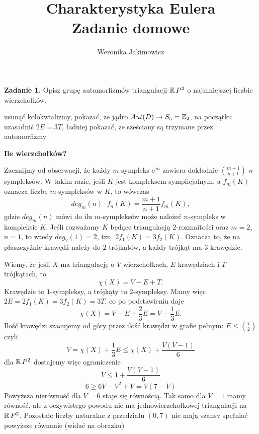 \documentclass{article}
\title{Charakterystyka Eulera\\{\normalsize Zadanie domowe}}
\author{Weronika Jakimowicz}
\date{}
\begin{document}
\maketitle

\textbf{\large\color{orange}Zadanie 1.} Opisz grupę automorfizmów triangulacji $\operatorname{\mathbb{R}} P^2$ o najmniejszej liczbie wierzchołków.

{\large\color{red}usunąć kolokwializmy, pokazać, że jądro $Aut(D)\to S_5=\operatorname{\mathbb{Z}}_2$, na początku uzasadnić $2E=3T$, ładniej pokazać, że sześciany są trzymane przez automorfizmy}

\textbf{Ile wierzchołków?}

Zacznijmy od obserwacji, że każdy $m$-sympleks $\sigma^m$ zawiera dokładnie $\binom{m+1}{n+1}$ $n$-sympleksów. W takim razie, jeśli $K$ jest kompleksem symplicjalnym, a $f_m(K)$ oznacza liczbę $m$-sympleksów w $K$, to wówczas
$$deg_m(n)\cdot f_n(K)=\frac{m+1}{n+1}f_m(K),$$
gdzie $deg_m(n)$ mówi do ilu $m$-sympleksów może należeć $n$-sympleks w kompleksie $K$. Jeśli rozważamy $K$ będące triangulacją $2$-rozmaitości oraz $m=2$, $n=1$, to wtedy $deg_2(1)=2$, tzn. $2 f_1(K)=3f_2(K)$. Oznacza to, że na płaszczyźnie krawędź należy do $2$ trójkątów, a każdy trójkąt ma $3$ krawędzie.

Wiemy, że jeśli $X$ ma triangulację o $V$ wierzchołkach, $E$ krawędziach i $T$ trójkątach, to 
$$\chi(X)=V-E+T.$$
Krawędzie to $1$-sympleksy, a trójkąty to $2$-sympleksy. Mamy więc $2E=2f_1(K)=3f_2(K)=3T$, co po podstawieniu daje
$$\chi(X)=V-E+\frac{2}{3}E=V-\frac{1}{3}E.$$
Ilość krawędzi szacujemy od góry przez ilość krawędzi w grafie pełnym: $E\leq \binom{V}{2}$ czyli
$$V=\chi(X)+\frac{1}{3}E\leq \chi(X)+\frac{V(V-1)}{6}$$
dla $\operatorname{\mathbb{R}} P^2$ dostajemy więc ograniczenie
$$V\leq 1+\frac{V(V-1)}{6}$$
$$6\geq 6V-V^2+V=V(7-V)$$
Powyższa nierówność dla $V=6$ staje się równością. Tak samo dla $V=1$ mamy równość, ale z oczywistego powodu nie ma jednowierzchołkowej triangulacji na $\operatorname{\mathbb{R}} P^2$. Pozostałe liczby naturalne z przedziału $(0, 7)$ nie mają szansy spełniać powyższe równanie (widać na obrazku)
\begin{center}
\end{center}
\end{document}
